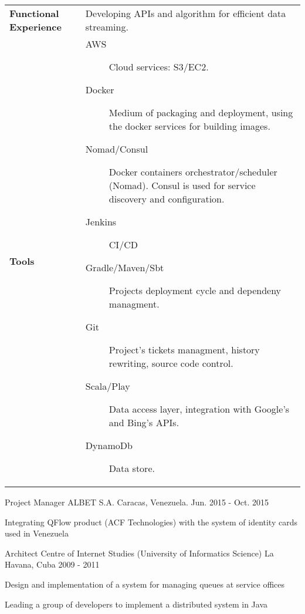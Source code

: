 \begin{cventries}
\begin{tabular}{|p{4.5cm} p{2cm} p{4cm} p{2cm} p{2cm}|}
    \textbf{Functional Experience} & \multicolumn{4}{p{12cm}|}{
      Developing APIs and algorithm for efficient data streaming.
      } \\

      \textbf{Tools} & \multicolumn{4}{p{12cm}|}{
                       \begin{description}
                       \item[AWS] Cloud services: S3/EC2.
                       \item[Docker] Medium of packaging and deployment, using the docker services for building images.

                       \item[Nomad/Consul]  Docker containers orchestrator/scheduler (Nomad). Consul is used for service discovery and configuration.
                       \item[Jenkins] CI/CD

                       \item[Gradle/Maven/Sbt] Projects deployment cycle and dependeny managment.
                       \item[Git]  Project's tickets managment, history rewriting, source code control.

                       \item[Scala/Play] Data access layer, integration with Google's and Bing's APIs.

                      \item[DynamoDb] Data store.

                       \end{description}
      } \\
 

    \hline

  \end{tabular}



\cventry
{Project Manager} %
{ALBET S.A.} %
{Caracas, Venezuela.} %
{Jun. 2015 - Oct. 2015} %
{ %
\begin{cvitems}
\item {Integrating QFlow product (ACF Technologies) with the system of identity cards used in Venezuela}
\end{cvitems}
}


\cventry
{Architect} %
{Centre of Internet Studies (University of Informatics Science)} %
{La Havana, Cuba} %
{2009 - 2011} %
{ %
\begin{cvitems}
\item {Design and implementation of a system for managing queues at service offices}
\item {Leading a group of developers to implement a distributed system in Java}
\end{cvitems}
}


\end{cventries}
